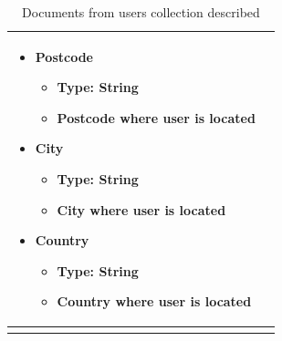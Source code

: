 \begin{center}
\begin{longtable}{ |m{4cm}|m{9cm}| }
\begin{itemize}
\begin{itemize}
\begin{itemize}
                \end{itemize}
            \item Postcode
                \begin{itemize}
                    \item Type: String
                    \item Postcode where user is located
                \end{itemize}
            \item City
                \begin{itemize}
                    \item Type: String
                    \item City where user is located
                \end{itemize}
            \item Country
                \begin{itemize}
                    \item Type: String
                    \item Country where user is located
                \end{itemize}
        \end{itemize}
 \end{itemize} \\
 \hline
\caption{Documents from users collection described}
\end{longtable}
\end{center}

